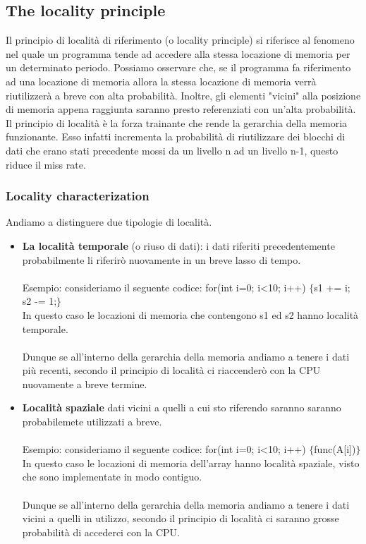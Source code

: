 \subsection{The locality principle}
Il principio di località di riferimento (o locality principle) si riferisce al fenomeno nel quale un programma tende ad accedere alla stessa locazione di memoria per un determinato periodo. Possiamo osservare che, se il programma fa riferimento ad una locazione di memoria allora la stessa locazione di memoria verrà riutilizzerà a breve con alta probabilità. Inoltre, gli elementi "vicini" alla posizione di memoria appena raggiunta saranno presto referenziati con un'alta probabilità. \\

Il principio di località è la forza trainante che rende la gerarchia della memoria funzionante. Esso infatti incrementa la probabilità di riutilizzare dei blocchi di dati che erano stati precedente mossi da un livello n ad un livello n-1, questo riduce il miss rate.

\subsubsection{Locality characterization}
Andiamo a distinguere due tipologie di località. 
\begin{itemize}
    \item \textbf{La località temporale} (o riuso di dati): i dati riferiti precedentemente probabilmente li riferirò nuovamente in un breve lasso di tempo. \\\\Esempio: consideriamo il seguente codice: for(int i=0; i<10; i++) $\{$s1 += i; s2 -= 1;$\}$\\
    In questo caso le locazioni di memoria che contengono s1 ed s2 hanno località temporale.\\\\
    Dunque se all'interno della gerarchia della memoria andiamo a tenere i dati più recenti, secondo il principio di località ci riaccenderò con la CPU nuovamente a breve termine.
    \item \textbf{Località spaziale} dati vicini a quelli a cui sto riferendo saranno saranno probabilemete utilizzati a breve.
    \\\\Esempio: consideriamo il seguente codice: for(int i=0; i<10; i++) $\{$func(A[i])$\}$\\
    In questo caso le locazioni di memoria dell'array hanno località spaziale, visto che sono implementate in modo contiguo.\\\\
    Dunque se all'interno della gerarchia della memoria andiamo a tenere i dati vicini a quelli in utilizzo, secondo il principio di località ci saranno grosse probabilità di accederci con la CPU.
\end{itemize}


